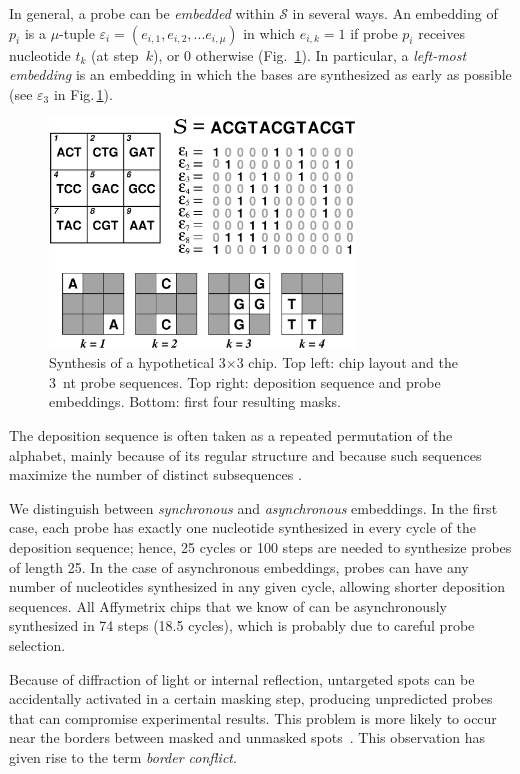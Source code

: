 \documentclass{llncs}
\begin{document}
In general, a probe can be \emph{embedded} within $\mathcal{S}$ in several
ways. An embedding of $p_{i}$ is a $\mu$-tuple
$\varepsilon_{i} = (e_{i,1}, e_{i,2}, ... e_{i,\mu})$ in which $e_{i,k} = 1$
if probe $p_{i}$ receives nucleotide $t_{k}$ (at step~$k$), or 0 otherwise
(Fig.~\ref{fig:masking_process}). In particular, a \emph{left-most embedding}
is an embedding in which the bases are synthesized as early as possible
(see $\varepsilon_3$ in Fig.\,\ref{fig:masking_process}).

\begin{figure}
\centerline{\includegraphics[width=230pt]{chip}}
\caption{Synthesis of a hypothetical 3$\times$3 chip. Top left: chip
layout and the 3~nt probe sequences. Top right: deposition
sequence and probe embeddings. Bottom: first four resulting masks.}
\label{fig:masking_process}
\vspace*{-2ex}
\end{figure}

The deposition sequence is often taken as a repeated permutation of the
alphabet, mainly because of its regular structure and because such sequences
maximize the number of distinct subsequences \cite{CHASE76}.  

We distinguish between \emph{synchronous} and \emph{asynchronous} embeddings.
In the first case, each probe has exactly one nucleotide synthesized in every
cycle of the deposition sequence; hence, 25 cycles or 100 steps are needed to
synthesize probes of length 25.  In the case of asynchronous embeddings,
probes can have any number of nucleotides synthesized in any given cycle,
allowing shorter deposition sequences. All Affymetrix chips that we know of
can be asynchronously synthesized in 74 steps (18.5 cycles), which is probably
due to careful probe selection.

Because of diffraction of light or internal reflection, untargeted spots can
be accidentally activated in a certain masking step, producing unpredicted
probes that can compromise experimental results. This problem is more likely
to occur near the borders between masked and unmasked spots~\cite{FODOR91}.
This observation has given rise to the term \emph{border conflict}.
\end{document}
